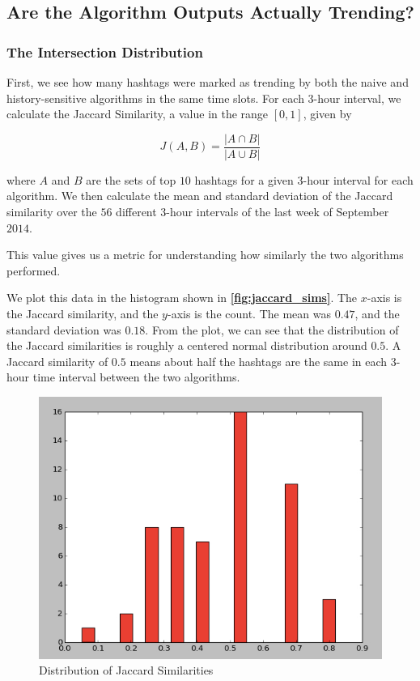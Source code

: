 \documentclass[twoside]{article}
\newcommand{\aref}[1]
 {\textbf{\autoref{#1}}}
\begin{document}
{\subsection{Are the Algorithm Outputs Actually Trending?}

\subsubsection{The Intersection Distribution}

First, we see how many hashtags were marked as trending 
by both the naive and history-sensitive algorithms in the same time slots.
For each $3$-hour interval, we calculate the Jaccard Similarity, a value
in the range $[0, 1]$, given by 

\begin{equation}
\label{eq:jaccard}
J(A, B) = \frac{|A \cap B|}{|A \cup B|}
\end{equation}

\noindent where $A$ and $B$ are the sets of top $10$ hashtags for a given $3$-hour interval
for each algorithm. 
We then calculate the mean and standard deviation of the Jaccard similarity
over the $56$ different $3$-hour intervals of the last week of September $2014$.

This value gives us a metric for understanding how similarly the two algorithms performed.

We plot this data in the histogram shown in \aref{fig:jaccard_sims}. The $x$-axis is the Jaccard similarity, and the $y$-axis is the count. The mean was $0.47$, and the standard deviation was $0.18$. From the plot, we can see that the distribution of the Jaccard similarities is roughly a centered normal distribution around $0.5$. A Jaccard similarity of $0.5$ means about half the hashtags are the same in each $3$-hour time interval between the two algorithms. 

\begin{figure}
\centering
\includegraphics[scale = .4]{jaccard_sims}
\caption{Distribution of Jaccard Similarities}
\label{fig:jaccard_sims}
\end{figure}

}
\end{document}
